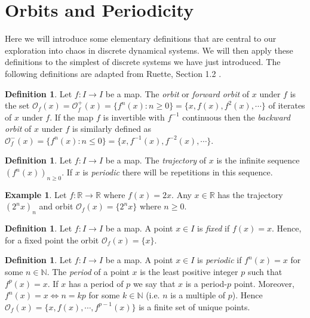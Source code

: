 \documentclass[11pt,a4paper,oneside]{memoir}
\theoremstyle{plain}
\theoremstyle{definition}
\newtheorem{defn}[thm]{Definition}
\newtheorem{exmp}[thm]{Example}
\begin{document}
\section{Orbits and Periodicity}
Here we will introduce some elementary definitions that are central to our exploration into chaos in discrete dynamical systems. We will then apply these definitions to the simplest of discrete systems we have just introduced. The following definitions are adapted from Ruette, Section 1.2 \cite{ruette}.

\begin{defn}
    Let $f: I \to I$ be a map. The \emph{orbit} or \emph{forward orbit} of $x$ under $f$ is the set $\mathcal{O}_f(x) = \mathcal{O}^+_f(x) = \lbrace f^n(x) : n \geq 0 \rbrace = \lbrace x, f(x), f^2(x), \cdots \rbrace$ of iterates of $x$ under $f$. If the map $f$ is invertible with $f^{-1}$ continuous then the \emph{backward orbit} of $x$ under $f$ is similarly defined as $\mathcal{O}^-_f(x) = \lbrace f^n(x) : n \leq 0 \rbrace = \lbrace x, f^{-1}(x), f^{-2}(x), \cdots \rbrace$.
\end{defn}

\begin{defn}
    Let $f: I \to I$ be a map. The \emph{trajectory} of $x$ is the infinite sequence $(f^n(x))_{n \geq 0}$. If $x$ is \emph{periodic} there will be repetitions in this sequence.
\end{defn}

\begin{exmp}
    Let $f: \mathbb{R} \to \mathbb{R}$ where $f(x) = 2x$. Any $x \in \mathbb{R}$ has the trajectory $(2^nx)_n$ and orbit $\mathcal{O}_f(x) = \lbrace 2^nx \rbrace$ where $n \geq 0$.
\end{exmp}

\begin{defn}
    Let $f: I \to I$ be a map. A point $x \in I$ is \emph{fixed} if $f(x) = x$. Hence, for a fixed point the orbit $\mathcal{O}_f(x) = \lbrace x \rbrace$.
\end{defn}

\begin{defn}
    Let $f: I \to I$ be a map. A point $x \in I$ is \emph{periodic} if $f^n(x) = x$ for some $n \in \mathbb{N}$. The \emph{period} of a point $x$ is the least positive integer $p$ such that $f^p(x) = x$. If $x$ has a period of $p$ we say that $x$ is a period-$p$ point. Moreover, $f^n(x) = x \iff n = kp$ for some $k \in \mathbb{N}$ (i.e. $n$ is a multiple of $p$). Hence $\mathcal{O}_f(x) = \lbrace x, f(x), \cdots, f^{p-1}(x) \rbrace$ is a finite set of unique points.

\end{defn}
\end{document}

